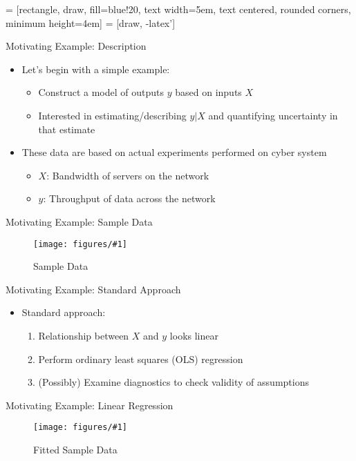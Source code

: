 \documentclass{beamer}
\newcommand{\img}[3]{\begin{figure}\centering\texttt{[image: figures/\#1]}\caption{#2}\end{figure}}
\begin{document}
	
 = [rectangle, draw, fill=blue!20, 
text width=5em, text centered, rounded corners, minimum height=4em]
 = [draw, -latex']
	
\begin{frame}{Motivating Example: Description}
\begin{itemize}
	\item Let's begin with a simple example:
		\begin{itemize}
			\item Construct a model of outputs $y$ based on inputs $X$
			\item Interested in estimating/describing $y|X$ and quantifying uncertainty in that estimate
		\end{itemize}
	\item These data are based on actual experiments performed on cyber system
		\begin{itemize}
			\item $X$: Bandwidth of servers on the network
			\item $y$: Throughput of data across the network
		\end{itemize}
\end{itemize}
\end{frame}

\begin{frame}{Motivating Example: Sample Data}
	\img{lm-error-dist-standard-point.pdf}{Sample Data}{4}
\end{frame}

\begin{frame}{Motivating Example: Standard Approach}
\begin{itemize}
	\item Standard approach:
		\begin{enumerate}
			\item Relationship between $X$ and $y$ looks linear
			\item Perform ordinary least squares (OLS) regression
			\item (Possibly) Examine diagnostics to check validity of assumptions
		\end{enumerate}
\end{itemize}
\end{frame}

\begin{frame}{Motivating Example: Linear Regression}
	\img{lm-error-dist-standard-fit.pdf}{Fitted Sample Data}{4}
\end{frame}
\end{document}
